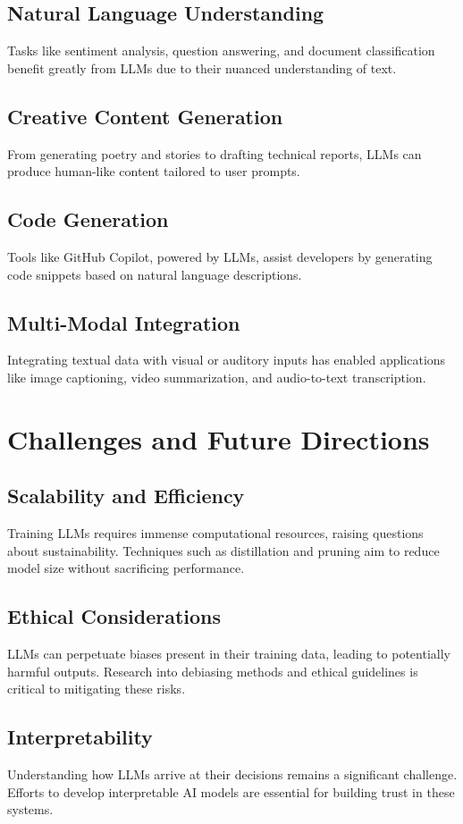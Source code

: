 \subsection{Natural Language Understanding}
Tasks like sentiment analysis, question answering, and document classification benefit greatly from LLMs due to their nuanced understanding of text.

\subsection{Creative Content Generation}
From generating poetry and stories to drafting technical reports, LLMs can produce human-like content tailored to user prompts.

\subsection{Code Generation}
Tools like GitHub Copilot, powered by LLMs, assist developers by generating code snippets based on natural language descriptions.

\subsection{Multi-Modal Integration}
Integrating textual data with visual or auditory inputs has enabled applications like image captioning, video summarization, and audio-to-text transcription.

\section{Challenges and Future Directions}
\subsection{Scalability and Efficiency}
Training LLMs requires immense computational resources, raising questions about sustainability. Techniques such as distillation and pruning aim to reduce model size without sacrificing performance.

\subsection{Ethical Considerations}
LLMs can perpetuate biases present in their training data, leading to potentially harmful outputs. Research into debiasing methods and ethical guidelines is critical to mitigating these risks.

\subsection{Interpretability}
Understanding how LLMs arrive at their decisions remains a significant challenge. Efforts to develop interpretable AI models are essential for building trust in these systems.

